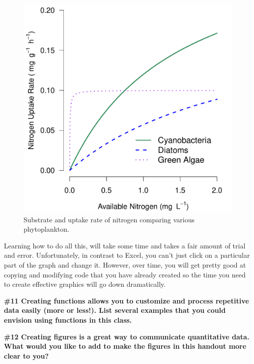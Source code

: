 \documentclass{tufte-handout}\usepackage[]{graphicx}\usepackage[]{color}
\makeatletter
\def\maxwidth{ %
  \ifdim\Gin@nat@width>\linewidth
    \linewidth
  \else
    \Gin@nat@width
  \fi
}
\newenvironment{knitrout}{}{} %
\makeatother
\begin{document}
\begin{figure}
\caption{Substrate and uptake rate of nitrogen comparing various phytoplankton.}
\label{fig:michaelis}
\begin{knitrout}
\color{fgcolor}
\includegraphics[width=\maxwidth]{figure/unnamed-chunk-63-1} 
\end{knitrout}
\end{figure}


Learning how to do all this, will take some time and takes a fair amount of trial and error. Unfortunately, in contrast to Excel, you can't just click on a particular part of the graph and change it. However, over time, you will get pretty good at copying and modifying code that you have already created so the time you need to create effective graphics will go down dramatically.

\bigskip
\noindent \textbf{\#11 Creating functions allows you to customize and process repetitive data easily (more or less!). List several examples that you could envision using functions in this class. }

\bigskip
\noindent \textbf{\#12 Creating figures is a great way to communicate quantitative data. What would you like to add to make the figures in this handout more clear to you?}
\end{document}
